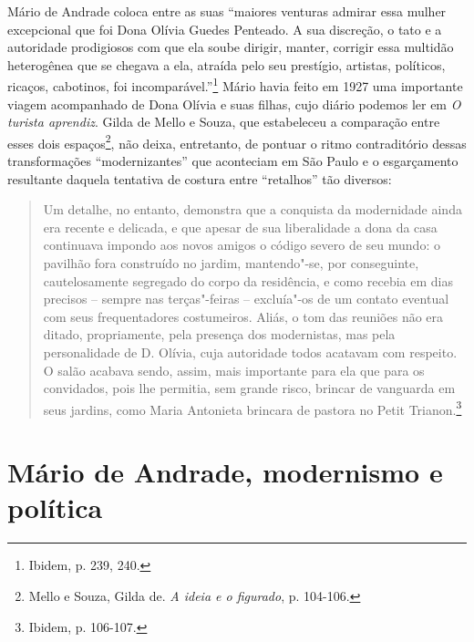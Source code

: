 Mário de Andrade coloca entre as suas ``maiores venturas admirar essa
mulher excepcional que foi Dona Olívia Guedes Penteado. A sua discreção,
o tato e a autoridade prodigiosos com que ela soube dirigir, manter,
corrigir essa multidão heterogênea que se chegava a ela, atraída pelo
seu prestígio, artistas, políticos, ricaços, cabotinos, foi
incomparável.''\footnote{Ibidem, p. 239, 240.} Mário havia feito em 1927
uma importante viagem acompanhado de Dona Olívia e suas filhas, cujo
diário podemos ler em \emph{O turista aprendiz}. Gilda de Mello e Souza,
que estabeleceu a comparação entre esses dois espaços\footnote{Mello e
  Souza, Gilda de. \emph{A ideia e o figurado}, p. 104-106.}, não
deixa, entretanto, de pontuar o ritmo contraditório dessas
transformações ``modernizantes'' que aconteciam em São Paulo e o
esgarçamento resultante daquela tentativa de costura entre ``retalhos''
tão diversos:

\begin{quote}
Um detalhe, no entanto, demonstra que a conquista da modernidade ainda
era recente e delicada, e que apesar de sua liberalidade a dona da casa
continuava impondo aos novos amigos o código severo de seu mundo: o
pavilhão fora construído no jardim, mantendo"-se, por conseguinte,
cautelosamente segregado do corpo da residência, e como recebia em dias
precisos -- sempre nas terças"-feiras -- excluía"-os de um contato
eventual com seus frequentadores costumeiros. Aliás, o tom das reuniões
não era ditado, propriamente, pela presença dos modernistas, mas pela
personalidade de D. Olívia, cuja autoridade todos acatavam com respeito.
O salão acabava sendo, assim, mais importante para ela que para os
convidados, pois lhe permitia, sem grande risco, brincar de vanguarda em
seus jardins, como Maria Antonieta brincara de pastora no Petit
Trianon.\footnote{Ibidem, p. 106-107.}
\end{quote}

\section{Mário de Andrade, modernismo e política}

